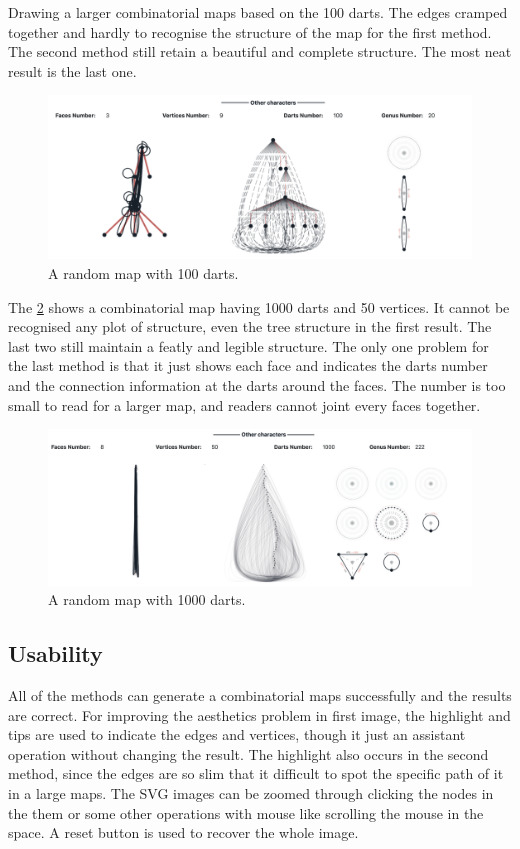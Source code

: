   Drawing a larger combinatorial maps based on the 100 darts. The edges cramped together and hardly to recognise the structure of the map for the first method. The second method still retain a beautiful and complete structure. The most neat result is the last one.

  \begin{figure}[htb]
    \centering
    \includegraphics[width=1\textwidth]{../../image/clear2.png}
    \caption{A random map with 100 darts.}
    \label{fig:figures:clear2}
  \end{figure}

  The \cref{fig:figures:clear3} shows a combinatorial map having 1000 darts and 50 vertices. It cannot be recognised any plot of structure, even the tree structure in the first result. The last two still maintain a featly and legible structure. The only one problem for the last method is that it just shows each face and indicates the darts number and the connection information at the darts around the faces. The number is too small to read for  a larger map, and readers cannot joint every faces together.
  \begin{figure}[htb]
    \centering
    \includegraphics[width=1\textwidth]{../../image/clear3.png}
    \caption{A random map with 1000 darts.}
    \label{fig:figures:clear3}
  \end{figure}

  \subsection{Usability}
  All of the methods can generate a combinatorial maps successfully and the results are correct. For improving the aesthetics problem in first image, the highlight and tips are used to indicate the edges and vertices, though it just an assistant operation without changing the result. The highlight also occurs in the second method, since the edges are so slim that it difficult to spot the specific path of it in a large maps.  The SVG images can be zoomed through clicking the nodes in the them or some other operations with mouse like scrolling the mouse in the space. A reset button is used to recover the whole image.

